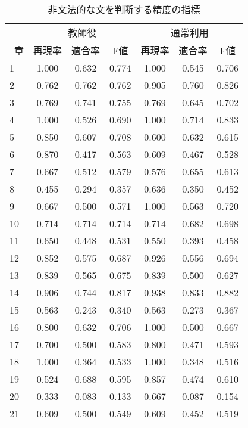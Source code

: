 \begin{table}[H]  %
    \centering
    \small
    \tabcolsep 3pt
    \caption{非文法的な文を判断する精度の指標}
    \label{tab:sample2}
    \begin{tabular}{lcccccc}
    \hline
    \multicolumn{1}{l}{} & \multicolumn{3}{c}{教師役} & \multicolumn{3}{c}{通常利用}\\
    \      章 & 再現率 & 適合率 &F値 & 再現率 & 適合率 &F値\\
    \hline
    1 & 1.000 & 0.632 & 0.774 & 1.000 & 0.545 & 0.706 \\
    2 & 0.762 & 0.762 & 0.762 & 0.905 & 0.760 & 0.826 \\
    3 & 0.769 & 0.741 & 0.755 & 0.769 & 0.645 & 0.702 \\
    4 & 1.000 & 0.526 & 0.690 & 1.000 & 0.714 & 0.833 \\
    5 & 0.850 & 0.607 & 0.708 & 0.600 & 0.632 & 0.615 \\
    6 & 0.870 & 0.417 & 0.563 & 0.609 & 0.467 & 0.528 \\
    7 & 0.667 & 0.512 & 0.579 & 0.576 & 0.655 & 0.613 \\
    8 & 0.455 & 0.294 & 0.357 & 0.636 & 0.350 & 0.452 \\
    9 & 0.667 & 0.500 & 0.571 & 1.000 & 0.563 & 0.720 \\
    10 & 0.714 & 0.714 & 0.714 & 0.714 & 0.682 & 0.698 \\
    11 & 0.650 & 0.448 & 0.531 & 0.550 & 0.393 & 0.458 \\
    12 & 0.852 & 0.575 & 0.687 & 0.926 & 0.556 & 0.694 \\
    13 & 0.839 & 0.565 & 0.675 & 0.839 & 0.500 & 0.627 \\
    14 & 0.906 & 0.744 & 0.817 & 0.938 & 0.833 & 0.882 \\
    15 & 0.563 & 0.243 & 0.340 & 0.563 & 0.273 & 0.367 \\
    16 & 0.800 & 0.632 & 0.706 & 1.000 & 0.500 & 0.667 \\
    17 & 0.700 & 0.500 & 0.583 & 0.800 & 0.471 & 0.593 \\
    18 & 1.000 & 0.364 & 0.533 & 1.000 & 0.348 & 0.516 \\
    19 & 0.524 & 0.688 & 0.595 & 0.857 & 0.474 & 0.610 \\
    20 & 0.333 & 0.083 & 0.133 & 0.667 & 0.087 & 0.154 \\
    21 & 0.609 & 0.500 & 0.549 & 0.609 & 0.452 & 0.519 \\

\end{tabular}
\end{table}
